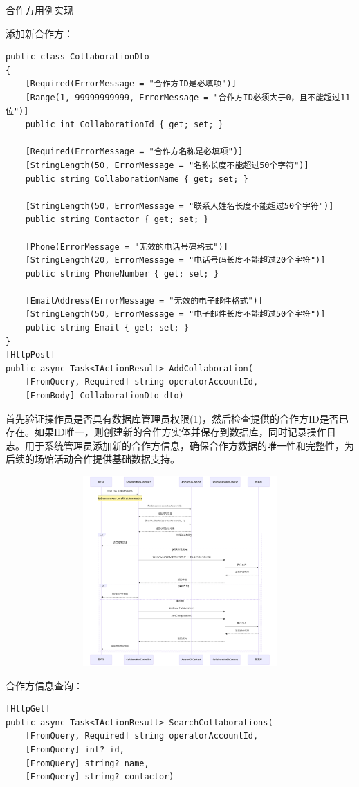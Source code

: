 \documentclass[]{article}
\let\oldincludegraphics\includegraphics
\renewcommand{\includegraphics}[2][]{%
  \begin{center}\oldincludegraphics[#1]{#2}\end{center}%
}
\begin{document}
合作方用例实现

添加新合作方：

\begin{verbatim}
public class CollaborationDto
{
    [Required(ErrorMessage = "合作方ID是必填项")]
    [Range(1, 99999999999, ErrorMessage = "合作方ID必须大于0，且不能超过11位")]
    public int CollaborationId { get; set; }

    [Required(ErrorMessage = "合作方名称是必填项")]
    [StringLength(50, ErrorMessage = "名称长度不能超过50个字符")]
    public string CollaborationName { get; set; }

    [StringLength(50, ErrorMessage = "联系人姓名长度不能超过50个字符")]
    public string Contactor { get; set; }

    [Phone(ErrorMessage = "无效的电话号码格式")]
    [StringLength(20, ErrorMessage = "电话号码长度不能超过20个字符")]
    public string PhoneNumber { get; set; }

    [EmailAddress(ErrorMessage = "无效的电子邮件格式")]
    [StringLength(50, ErrorMessage = "电子邮件长度不能超过50个字符")]
    public string Email { get; set; }
}
[HttpPost]
public async Task<IActionResult> AddCollaboration(
    [FromQuery, Required] string operatorAccountId,
    [FromBody] CollaborationDto dto)
\end{verbatim}

首先验证操作员是否具有数据库管理员权限(1)，然后检查提供的合作方ID是否已存在。如果ID唯一，则创建新的合作方实体并保存到数据库，同时记录操作日志。用于系统管理员添加新的合作方信息，确保合作方数据的唯一性和完整性，为后续的场馆活动合作提供基础数据支持。

\includegraphics[width=5.64167in,height=2.86458in]{media/media/image_2-4-5.png}

合作方信息查询：

\begin{verbatim}
[HttpGet]
public async Task<IActionResult> SearchCollaborations(
    [FromQuery, Required] string operatorAccountId,
    [FromQuery] int? id,
    [FromQuery] string? name,
    [FromQuery] string? contactor)
\end{verbatim}
\end{document}
